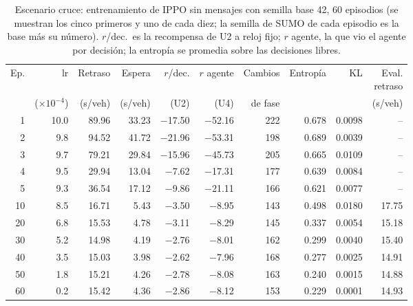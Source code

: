 \begin{table}[H]
\centering
\scriptsize
\setlength{\tabcolsep}{3pt}
\setlength{\tabcolsep}{2pt}
\begin{tabular}{rrrrrrrrrr}
\toprule
Ep. & lr & Retraso & Espera & $r$/dec. & $r$ agente & Cambios & Entropía & KL & \makecell{Eval.\\retraso} \\
 & ($\times 10^{-4}$) & (s/veh) & (s/veh) & (U2) & (U4) & de fase &  &  & (s/veh) \\
\midrule
1 & 10.0 & 89.96 & 33.23 & $-$17.50 & $-$52.16 & 222 & 0.678 & 0.0098 & -- \\
2 & 9.8 & 94.52 & 41.72 & $-$21.96 & $-$53.31 & 198 & 0.689 & 0.0039 & -- \\
3 & 9.7 & 79.21 & 29.84 & $-$15.96 & $-$45.73 & 205 & 0.665 & 0.0109 & -- \\
4 & 9.5 & 29.94 & 13.04 & $-$7.62 & $-$17.31 & 177 & 0.639 & 0.0084 & -- \\
5 & 9.3 & 36.54 & 17.12 & $-$9.86 & $-$21.11 & 166 & 0.621 & 0.0077 & -- \\
10 & 8.5 & 16.71 & 5.43 & $-$3.50 & $-$8.95 & 143 & 0.498 & 0.0180 & 17.75 \\
20 & 6.8 & 15.53 & 4.78 & $-$3.11 & $-$8.29 & 145 & 0.337 & 0.0054 & 15.18 \\
30 & 5.2 & 14.98 & 4.19 & $-$2.76 & $-$8.01 & 162 & 0.299 & 0.0040 & 15.40 \\
40 & 3.5 & 15.03 & 3.98 & $-$2.62 & $-$7.96 & 168 & 0.277 & 0.0025 & 14.91 \\
50 & 1.8 & 15.21 & 4.26 & $-$2.78 & $-$8.08 & 163 & 0.240 & 0.0015 & 14.88 \\
60 & 0.2 & 15.42 & 4.36 & $-$2.86 & $-$8.12 & 153 & 0.229 & 0.0001 & 14.93 \\
\bottomrule
\end{tabular}
\caption[Escenario cruce: entrenamiento de IPPO sin mensajes, semilla base 42]{Escenario cruce: entrenamiento de IPPO sin mensajes con semilla base 42, 60 episodios (se muestran los cinco primeros y uno de cada diez; la semilla de SUMO de cada episodio es la base más su número). $r$/dec.\ es la recompensa de U2 a reloj fijo; $r$ agente, la que vio el agente por decisión; la entropía se promedia sobre las decisiones libres.}
\label{tab:cruce-ippo-local-42}
\end{table}

